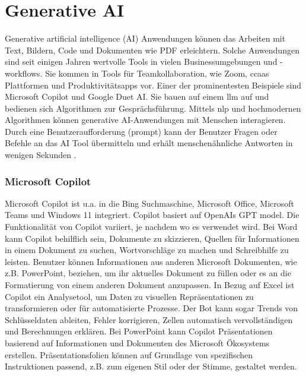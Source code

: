 \section{Generative AI}
Generative artificial intelligence (AI) Anwendungen können das Arbeiten mit Text, Bildern, Code und Dokumenten wie PDF erleichtern. Solche Anwendungen sind seit einigen Jahren wertvolle Tools in vielen Businessumgebungen und -workflows. Sie kommen in Tools für Teamkollaboration, wie Zoom, \gls{ccaas} Plattformen und Produktivitätsapps vor. Einer der prominentesten Beispiele sind Microsoft Copilot und Google Duet AI. Sie bauen auf einem \gls{llm} auf und bedienen sich Algorithmen zur Gesprächsführung. Mittels \gls{nlp} und hochmodernen Algorithmen können generative AI-Anwendungen mit Menschen interagieren. Durch eine Benutzeraufforderung (prompt) kann der Benutzer Fragen oder Befehle an das AI Tool übermitteln und erhält menschenähnliche Antworten in wenigen Sekunden \cite{copilot-duet}.

\subsubsection{Microsoft Copilot}
Microsoft Copilot ist u.a. in die Bing Suchmaschine, Microsoft Office, Microsoft Teams und Windows 11 integriert. Copilot basiert auf OpenAIs GPT model. Die Funktionalität von Copilot variiert, je nachdem wo es verwendet wird. Bei Word kann Copilot behilflich sein, Dokumente zu skizzieren, Quellen für Informationen in einem Dokument zu suchen, Wortvorschläge zu machen und Schreibhilfe zu leisten. Benutzer können Informationen aus anderen Microsoft Dokumenten, wie z.B. PowerPoint, beziehen, um ihr aktuelles Dokument zu füllen oder es an die Formatierung von einem anderen Dokument anzupassen. In Bezug auf Excel ist Copilot ein Analysetool, um Daten zu visuellen Repräsentationen zu transformieren oder für automatisierte Prozesse. Der Bot kann sogar Trends von Schlüsseldaten ableiten, Fehler korrigieren, Zellen automatisch vervollständigen und Berechnungen erklären. Bei PowerPoint kann Copilot Präsentationen basierend auf Informationen und Dokumenten des Microsoft Ökosystems erstellen. Präsentationsfolien können auf Grundlage von spezifischen Instruktionen passend, z.B. zum eigenen Stil oder der Stimme, gestaltet werden. 

